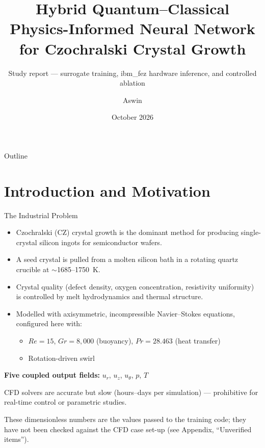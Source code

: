 \documentclass[aspectratio=169]{beamer}
\title{Hybrid Quantum--Classical Physics-Informed Neural Network \\ for Czochralski Crystal Growth}
\subtitle{Study report --- surrogate training, ibm\_fez hardware inference, and controlled ablation}
\author{Aswin}
\date{October 2026}
\begin{document}
\begin{frame}
\titlepage
\end{frame}

\begin{frame}{Outline}
\tableofcontents
\end{frame}

\section{Introduction and Motivation}

\begin{frame}{The Industrial Problem}
\begin{itemize}
  \item Czochralski (CZ) crystal growth is the dominant method for producing single-crystal silicon ingots for semiconductor wafers.
  \item A seed crystal is pulled from a molten silicon bath in a rotating quartz crucible at $\sim$1685--1750~K.
  \item Crystal quality (defect density, oxygen concentration, resistivity uniformity) is controlled by melt hydrodynamics and thermal structure.
  \item Modelled with axisymmetric, incompressible Navier--Stokes equations, configured here with:
  \begin{itemize}
    \item $Re = 15$, $Gr = 8{,}000$ (buoyancy), $Pr = 28.463$ (heat transfer)
    \item Rotation-driven swirl
  \end{itemize}
\end{itemize}

\vspace{0.2cm}
\textbf{Five coupled output fields:} $u_r$, $u_z$, $u_\theta$, $p$, $T$

\vspace{0.2cm}
CFD solvers are accurate but slow (hours--days per simulation) --- prohibitive for real-time control or parametric studies.

\vspace{0.1cm}
\scriptsize These dimensionless numbers are the values passed to the training code; they have not been checked against the CFD case set-up (see Appendix, ``Unverified items'').
\end{frame}
\end{document}
